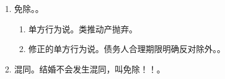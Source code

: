 \begin{enumerate}
        \begin{enumerate}
          \item 视为履行，债务消灭。
          \item 提存部门妥善保管义务。
          \item 提存人凭判决、裁定、公证证明取回提存物。
          \item 5 年后归国家。
        \end{enumerate}
  \item 免除。。
        \begin{enumerate}
          \item 单方行为说。类推动产抛弃。
          \item 修正的单方行为说。债务人合理期限明确反对除外。。
        \end{enumerate}
  \item 混同。结婚不会发生混同，叫免除！！。
\end{enumerate}
